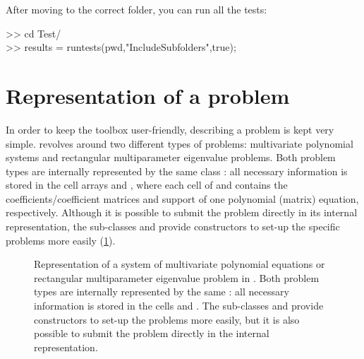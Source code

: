 \documentclass{manual}
\begin{document}
            \begin{code}
                After moving to the correct folder, you can run all the tests:
                \begin{codeblock}
                    >> cd \textcolor{string}{Test/} \\
                    >> results = runtests(pwd,\textcolor{string}{"IncludeSubfolders"},true);
                \end{codeblock}
            \end{code}
            
    \section{Representation of a problem}
        \label{sec:manual:representation}

        In order to keep the toolbox user-friendly, describing a problem is kept very simple.
        \maclab\space revolves around two different types of problems: multivariate polynomial systems and rectangular multiparameter eigenvalue problems. 
        Both problem types are internally represented by the same class : all necessary information is stored in the cell arrays  and , where each cell of  and  contains the coefficients/coefficient matrices and support of one polynomial (matrix) equation, respectively.
        Although it is possible to submit the problem directly in its internal representation, the sub-classes  and  provide constructors to set-up the specific problems more easily (\cref{fig:manual:representation}).

        \begin{figure}
            \centering
            
            \caption{Representation of a system of multivariate polynomial equations or rectangular multiparameter eigenvalue problem in \maclab. Both problem types are internally represented by the same : all necessary information is stored in the cells  and . The sub-classes  and  provide constructors to set-up the problems more easily, but it is also possible to submit the problem directly in the internal representation.}
            \label{fig:manual:representation}
        \end{figure}
\end{document}
